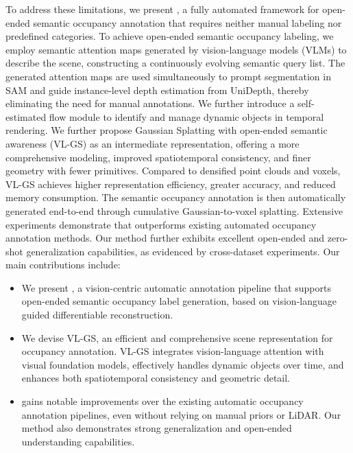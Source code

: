 
To address these limitations, we present \ourmethod{}, a fully automated framework for open-ended semantic occupancy annotation that requires neither manual labeling nor predefined categories.
%
To achieve open-ended semantic occupancy labeling, we employ semantic attention maps generated by vision-language models (VLMs) to describe the scene, constructing a continuously evolving semantic query list. The generated attention maps are used simultaneously to prompt segmentation in SAM and guide instance-level depth estimation from UniDepth, thereby eliminating the need for manual annotations. We further introduce a self-estimated flow module to identify and manage dynamic objects in temporal rendering. We further propose Gaussian Splatting with open-ended semantic awareness (VL-GS) as an intermediate representation, offering a more comprehensive modeling, improved spatiotemporal consistency, and finer geometry with fewer primitives. Compared to densified point clouds and voxels, VL-GS achieves higher representation efficiency, greater accuracy, and reduced memory consumption. The semantic occupancy annotation is then automatically generated end-to-end through cumulative Gaussian-to-voxel splatting.
%
%
Extensive experiments demonstrate that \ourmethod{} outperforms existing automated occupancy annotation methods. Our method further exhibits excellent open-ended and zero-shot generalization capabilities, as evidenced by cross-dataset experiments.
%
Our main contributions include:
\begin{itemize}
\item We present \ourmethod{}, a vision-centric automatic annotation pipeline that supports open-ended semantic occupancy label generation, based on vision-language guided differentiable reconstruction.

\item We devise VL-GS, an efficient and comprehensive scene representation for occupancy annotation. VL-GS integrates vision-language attention with visual foundation models, effectively handles dynamic objects over time, and enhances both spatiotemporal consistency and geometric detail. 

\item \ourmethod{} gains notable improvements over the existing automatic occupancy annotation pipelines, even without relying on manual priors or LiDAR. Our method also demonstrates strong generalization and open-ended understanding capabilities.
\end{itemize}
